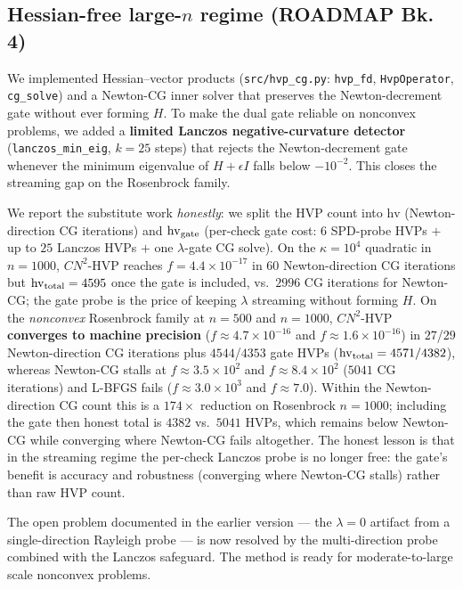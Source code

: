 \documentclass[11pt]{article}
\newcommand{\cn}{CN^2}
\begin{document}
\subsection{Hessian-free large-$n$ regime (ROADMAP Bk. 4)}
We implemented Hessian--vector products
(\texttt{src/hvp\_cg.py}: \texttt{hvp\_fd}, \texttt{HvpOperator},
\texttt{cg\_solve}) and a Newton-CG inner solver that preserves the
Newton-decrement gate without ever forming $H$. To make the dual gate reliable
on nonconvex problems, we added a \textbf{limited Lanczos negative-curvature
detector} (\texttt{lanczos\_min\_eig}, $k=25$ steps) that rejects the
Newton-decrement gate whenever the minimum eigenvalue of $H+\epsilon I$ falls
below $-10^{-2}$. This closes the streaming gap on the Rosenbrock family.

We report the substitute work \emph{honestly}: we split the HVP count into
$\mathrm{hv}$ (Newton-direction CG iterations) and $\mathrm{hv}_{\rm gate}$
(per-check gate cost: $6$ SPD-probe HVPs $+$ up to $25$ Lanczos HVPs $+$ one
$\lambda$-gate CG solve). On the $\kappa{=}10^4$ quadratic in $n=1000$,
$\cn$-HVP reaches $f=4.4{\times}10^{-17}$ in $60$ Newton-direction CG
iterations but $\mathrm{hv}_{\rm total}=4595$ once the gate is included,
vs.\ $2996$ CG iterations for Newton-CG; the gate probe is the price of keeping
$\lambda$ streaming without forming $H$. On the \emph{nonconvex} Rosenbrock
family at $n=500$ and $n=1000$, $\cn$-HVP \textbf{converges to machine
precision} ($f\approx4.7{\times}10^{-16}$ and $f\approx1.6{\times}10^{-16}$)
in $27$/$29$ Newton-direction CG iterations plus $4544$/$4353$ gate HVPs
($\mathrm{hv}_{\rm total}=4571/4382$), whereas Newton-CG stalls at
$f\approx3.5{\times}10^2$ and $f\approx8.4{\times}10^2$ ($5041$ CG iterations)
and L-BFGS fails ($f\approx3.0{\times}10^3$ and $f\approx7.0$). Within the
Newton-direction CG count this is a $174\times$ reduction on Rosenbrock
$n=1000$; including the gate then honest total is $4382$ vs.\ $5041$ HVPs,
which remains below Newton-CG while converging where Newton-CG fails
altogether. The honest lesson is that in the streaming regime the per-check
Lanczos probe is no longer free: the gate's benefit is accuracy and robustness
(converging where Newton-CG stalls) rather than raw HVP count.

The open problem documented in the earlier version — the $\lambda{=}0$ artifact
from a single-direction Rayleigh probe — is now resolved by the multi-direction
probe combined with the Lanczos safeguard. The method is ready for
moderate-to-large scale nonconvex problems.
\end{document}
